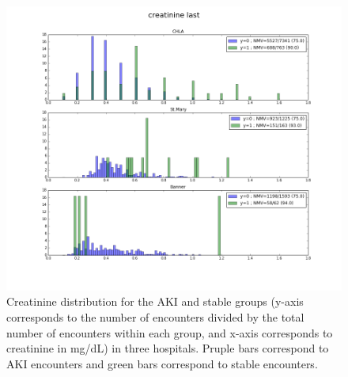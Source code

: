 \documentclass[
   technote
]{phildoc}
\begin{document}

\begin{figure}[!htbp]
\centering
\includegraphics[width=\textwidth]{./figures/creatinine_last.png}
\caption{Creatinine distribution for the AKI and stable groups (y-axis corresponds to the number of encounters divided by the total number of encounters within each group, and x-axis corresponds to creatinine in mg/dL) in three hospitals. Pruple bars correspond to AKI encounters and green bars correspond to stable encounters.} 
\label{fig:creatinine_dist}      
\end{figure}


\end{document}
